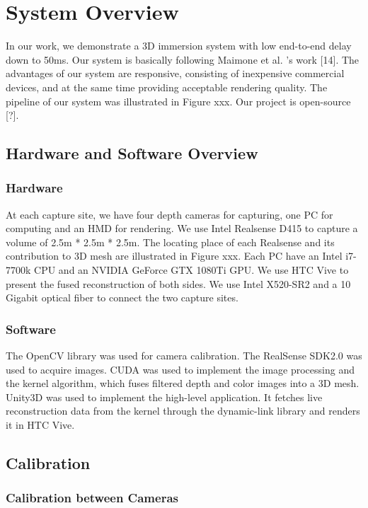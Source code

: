 \section{System Overview}

In our work, we demonstrate a 3D immersion system with low end-to-end delay down to 50ms. Our system is basically following Maimone et al. 's work [14]. The advantages of our system are responsive, consisting of inexpensive commercial devices, and at the same time providing acceptable rendering quality. The pipeline of our system was illustrated in Figure xxx. Our project is open-source [?].

\subsection{Hardware and Software Overview}

\subsubsection{Hardware}

At each capture site, we have four depth cameras for capturing, one PC for computing and an HMD for rendering. We use Intel Realsense D415 to capture a volume of 2.5m * 2.5m * 2.5m. The locating place of each Realsense and its contribution to 3D mesh are illustrated in Figure xxx. Each PC have an Intel i7-7700k CPU and an NVIDIA GeForce GTX 1080Ti GPU. We use HTC Vive to present the fused reconstruction of both sides. We use Intel X520-SR2 and a 10 Gigabit optical fiber to connect the two capture sites.

\subsubsection{Software}

The OpenCV library was used for camera calibration. The RealSense SDK2.0 was used to acquire images. CUDA was used to implement the image processing and the kernel algorithm, which fuses filtered depth and color images into a 3D mesh. Unity3D was used to implement the high-level application. It fetches live reconstruction data from the kernel through the dynamic-link library and renders it in HTC Vive.

\subsection{Calibration}

\subsubsection{Calibration between Cameras}

